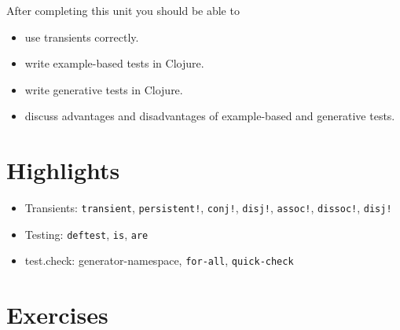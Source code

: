 \documentclass[11pt,a4paper]{article}
\begin{document}
After completing this unit you should be able to

\begin{itemize}
    \item use transients correctly.
    \item write example-based tests in Clojure.
    \item write generative tests in Clojure.
    \item discuss advantages and disadvantages of example-based and generative tests.
\end{itemize}

\section{Highlights}

\begin{itemize}
    \item Transients: \verb|transient|, \verb|persistent!|, \verb|conj!|, \verb|disj!|, \verb|assoc!|, \verb|dissoc!|, \verb|disj!|
    \item Testing: \verb|deftest|, \verb|is|, \verb|are|
    \item test.check: generator-namespace, \verb|for-all|, \verb|quick-check|
\end{itemize}



\section{Exercises}
\end{document}
